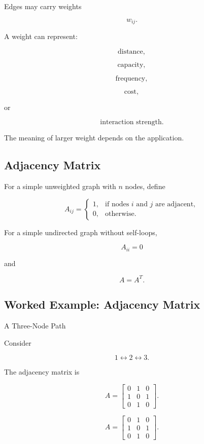 Edges may carry weights

\[
\boxed{
w_{ij}.
}
\]

A weight can represent:

\[
\boxed{
\text{distance},
}
\]

\[
\boxed{
\text{capacity},
}
\]

\[
\boxed{
\text{frequency},
}
\]

\[
\boxed{
\text{cost},
}
\]

or

\[
\boxed{
\text{interaction strength}.
}
\]

The meaning of larger weight depends on the application.

\subsection{Adjacency Matrix}
\label{subsec:network-adjacency-matrix}

For a simple unweighted graph with \(n\) nodes, define

\[
\boxed{
A_{ij}
=
\begin{cases}
1, & \text{if nodes }i\text{ and }j\text{ are adjacent},\\
0, & \text{otherwise}.
\end{cases}
}
\]

For a simple undirected graph without self-loops,

\[
A_{ii}=0
\]

and

\[
A=A^T.
\]

\subsection{Worked Example: Adjacency Matrix}
\label{subsec:worked-network-adjacency}

\begin{workedexamplebox}{A Three-Node Path}

Consider

\[
1
\longleftrightarrow
2
\longleftrightarrow
3.
\]

The adjacency matrix is

\[
A
=
\begin{bmatrix}
0 & 1 & 0\\
1 & 0 & 1\\
0 & 1 & 0
\end{bmatrix}.
\]

\begin{answerbox}
\[
\boxed{
A
=
\begin{bmatrix}
0 & 1 & 0\\
1 & 0 & 1\\
0 & 1 & 0
\end{bmatrix}.
}
\]
\end{answerbox}

\end{workedexamplebox}

